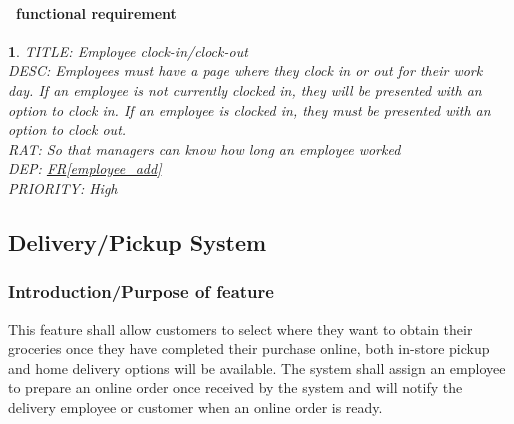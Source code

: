 \documentclass{scrreprt}
\theoremstyle{funreq}
\newtheorem{funreq}{}
\newcommand*{\reqref}[1]{\hyperref[#1]{FR\ref*{#1}}}
\begin{document}
	\paragraph[]{\Subsectionname ~functional requirement }
	\begin{funreq}
		\label{employee_clock}
		TITLE: Employee clock-in/clock-out\\
		DESC: Employees must have a page where they clock in or out for their work day.  If an employee is not currently clocked in, they will be presented with an option to clock in.  If an employee is clocked in, they must be presented with an option to clock out.\\
		RAT: So that managers can know how long an employee worked\\
		DEP: \reqref{employee_add}\\
		PRIORITY: High\\
	\end{funreq}
	
	\subsection{Delivery/Pickup System}
	\subsubsection{Introduction/Purpose of feature}
    This feature shall allow customers to select where they want to obtain their groceries once they have completed their purchase online, both in-store pickup and home delivery options will be available. The system shall assign an employee to prepare an online order once received by the system and will notify the delivery employee or customer when an online order is ready.

	\raggedbottom
	
\end{document}
